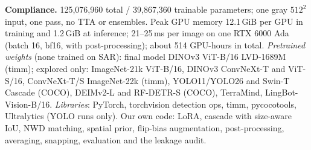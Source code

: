 \documentclass[10pt,twocolumn,letterpaper]{article}
\begin{document}
\textbf{Compliance.} 125{,}076{,}960 total / 39{,}867{,}360 trainable parameters; one gray $512^2$ input, one pass, no TTA or ensembles. Peak GPU memory 12.1\,GiB per GPU in training and 1.2\,GiB at inference; 21--25\,ms per image on one RTX 6000 Ada (batch 16, bf16, with post-processing); about 514 GPU-hours in total. \emph{Pretrained weights} (none trained on SAR): final model DINOv3 ViT-B/16 LVD-1689M (timm); explored only: ImageNet-21k ViT-B/16, DINOv3 ConvNeXt-T and ViT-S/16, ConvNeXt-T/S ImageNet-22k (timm), YOLO11/YOLO26 and Swin-T Cascade (COCO), DEIMv2-L and RF-DETR-S (COCO), TerraMind, LingBot-Vision-B/16. \emph{Libraries}: PyTorch, torchvision detection ops, timm, pycocotools, Ultralytics (YOLO runs only). Our own code: LoRA, cascade with size-aware IoU, NWD matching, spatial prior, flip-bias augmentation, post-processing, averaging, snapping, evaluation and the leakage audit.

{
    \small
    
    
}
\end{document}
